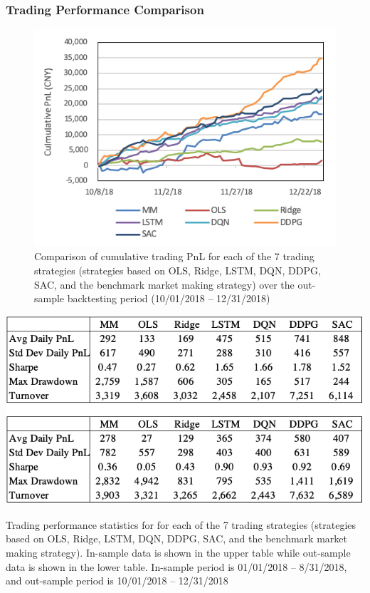 \documentclass{article}
\begin{document}
\subsubsection{Trading Performance Comparison}
\begin{figure}[h]
	\includegraphics[width=\linewidth]{bt_res.png}
	\caption{Comparison of cumulative trading PnL for each of the 7 trading strategies (strategies based on OLS, Ridge, LSTM, DQN, DDPG, SAC, and the benchmark market making strategy) over the out-sample backtesting period (10/01/2018 – 12/31/2018)}
	\label{fig:bt_pnl}
\end{figure}
\begin{table}[h]
	\includegraphics[width=\linewidth]{perf_stats.png}
	\caption{Trading performance statistics for for each of the 7 trading strategies (strategies based on OLS, Ridge, LSTM, DQN, DDPG, SAC, and the benchmark market making strategy). In-sample data is shown in the upper table while out-sample data is shown in the lower table. In-sample period is 01/01/2018 – 8/31/2018, and out-sample period is 10/01/2018 – 12/31/2018}
	\label{tab:perf_stats}
\end{table}
\end{document}
